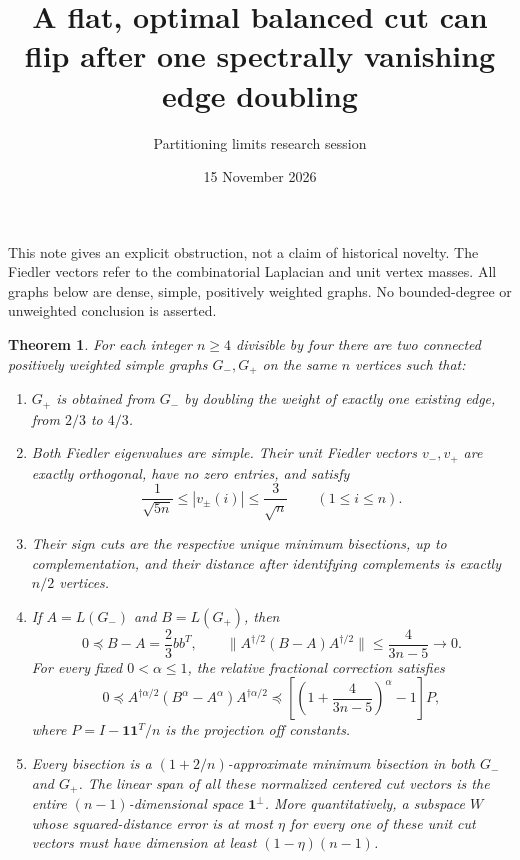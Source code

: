 \documentclass[11pt]{article}
\title{A flat, optimal balanced cut can flip after one spectrally vanishing edge doubling}
\author{Partitioning limits research session}
\date{15 November 2026}
\newtheorem{theorem}{Theorem}
\newcommand{\one}{\boldsymbol 1}
\begin{document}
\maketitle

This note gives an explicit obstruction, not a claim of historical novelty.
The Fiedler vectors refer to the combinatorial Laplacian and unit vertex
masses. All graphs below are dense, simple, positively weighted graphs.
No bounded-degree or unweighted conclusion is asserted.

\begin{theorem}\label{thm:main}
For each integer $n\ge4$ divisible by four there are two connected
positively weighted simple graphs $G_-,G_+$ on the same $n$ vertices such that:
\begin{enumerate}
\item $G_+$ is obtained from $G_-$ by doubling the weight of exactly one
existing edge, from $2/3$ to $4/3$.
\item Both Fiedler eigenvalues are simple. Their unit Fiedler vectors
$v_-,v_+$ are exactly orthogonal, have no zero entries, and satisfy
\[
 \frac1{\sqrt{5n}}\le |v_\pm(i)|\le\frac3{\sqrt n}
 \qquad(1\le i\le n).
\]
\item Their sign cuts are the respective unique minimum bisections, up
to complementation, and their distance after identifying complements is
exactly $n/2$ vertices.
\item If $A=L(G_-)$ and $B=L(G_+)$, then
\[
 0\preceq B-A=\frac23bb^T,\qquad
 \|A^{\dagger/2}(B-A)A^{\dagger/2}\|
 \le\frac4{3n-5}\longrightarrow0.
\]
For every fixed $0<\alpha\le1$, the relative fractional correction satisfies
\[
 0\preceq A^{\dagger\alpha/2}(B^\alpha-A^\alpha)
                    A^{\dagger\alpha/2}
 \preceq
 \left[\left(1+\frac4{3n-5}\right)^\alpha-1\right]P,
\]
where $P=I-\one\one^T/n$ is the projection off constants.
\item Every bisection is a $(1+2/n)$-approximate minimum bisection
in both $G_-$ and $G_+$. The linear span of all these normalized
centered cut vectors is the entire $(n-1)$-dimensional space $\one^\perp$.
More quantitatively, a subspace $W$ whose squared-distance error is at
most $\eta$ for every one of these unit cut vectors must have dimension
at least $(1-\eta)(n-1)$.
\end{enumerate}
\end{theorem}
\end{document}

